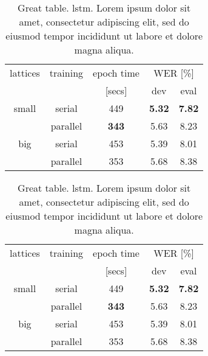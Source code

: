 \begin{table}
\centering
\caption{Great table. \Gls{lstm}.
Lorem ipsum dolor sit amet, consectetur adipiscing elit,
sed do eiusmod tempor incididunt ut labore et dolore magna aliqua.}
\label{tab:chap5:sth8}
\begin{tabular}{|c|c|c|c|c|}
\hline
lattices & training & epoch time & \multicolumn{2}{c|}{WER [\%]} \\
{}       & {}       & [secs]  & dev & eval \\ \hline \hline
small    & serial & 449  & \textbf{5.32} & \textbf{7.82} \\ \cline{2-5}
{}       & parallel & \textbf{343}  & 5.63 & 8.23 \\ \hline \hline
big      & serial   &   453        & 5.39 & 8.01 \\ \cline{2-5}
{}       & parallel &   353        & 5.68 & 8.38 \\ \hline
\end{tabular}
\end{table}


\begin{table}
\centering
\caption{Great table. \Gls{lstm}.
Lorem ipsum dolor sit amet, consectetur adipiscing elit,
sed do eiusmod tempor incididunt ut labore et dolore magna aliqua.}
\label{tab:chap5:sth9}
\begin{tabular}{|c|c|c|c|c|}
\hline
lattices & training & epoch time & \multicolumn{2}{c|}{WER [\%]} \\
{}       & {}       & [secs]  & dev & eval \\ \hline \hline
small    & serial & 449  & \textbf{5.32} & \textbf{7.82} \\ \cline{2-5}
{}       & parallel & \textbf{343}  & 5.63 & 8.23 \\ \hline \hline
big      & serial   &   453        & 5.39 & 8.01 \\ \cline{2-5}
{}       & parallel &   353        & 5.68 & 8.38 \\ \hline
\end{tabular}
\end{table}

